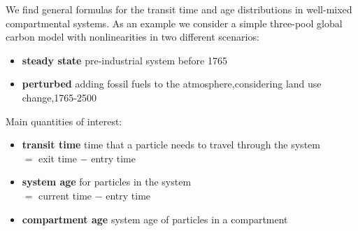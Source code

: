 \begin{minipage}{\textwidth}
We find general formulas for the transit time and age distributions in well-mixed compartmental systems.
As an example we consider a simple three-pool global carbon model
 with nonlinearities in two different scenarios:
\end{minipage}

\begin{itemize}
	\item \textbf{steady state} pre-industrial system before 1765
	\item \textbf{perturbed}  adding fossil fuels to the atmosphere,considering land use change,1765-2500
\end{itemize}
\vspace{0.5cm}
{\large Main quantities of interest:}

\begin{itemize}
	\item \textbf{transit time}  time that a particle needs to travel through  the system \\ $=$ exit time $-$ entry time
	\item \textbf{system age}  for particles in the system \\ $=$ current time $-$ entry time
	\item \textbf{compartment age}  system age of particles in a compartment 
\end{itemize}
\vspace{.5cm}
